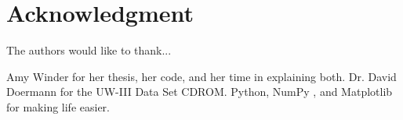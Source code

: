 \documentclass[conference]{IEEEtran}
\begin{document}


\section*{Acknowledgment}

The authors would like to thank...

Amy Winder for her thesis, her code, and her time in explaining both.  Dr.
David Doermann for the UW-III Data Set CDROM. Python, NumPy
\cite{oliphant-2006-guide}, and Matplotlib
\cite{Hunter:2007} for making life easier.



%
%
%
% 
% 
% 
% 
% 




\end{document}

